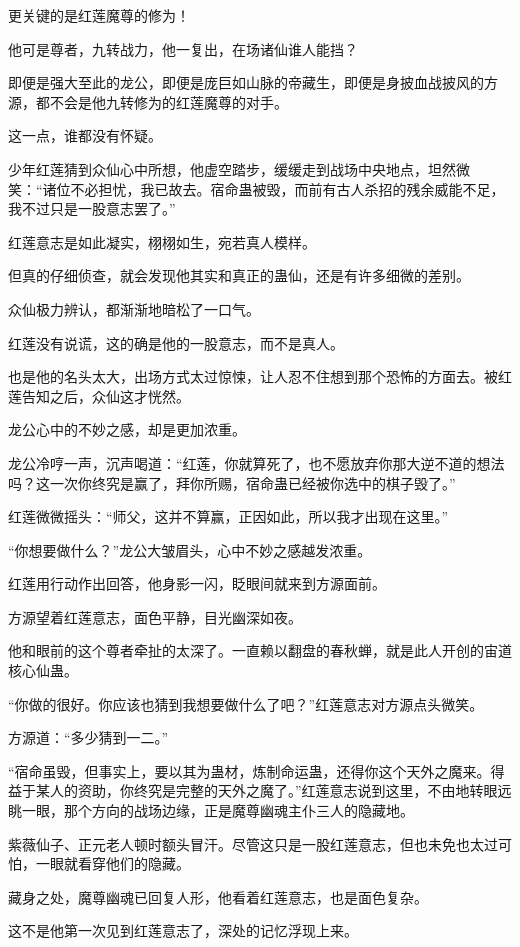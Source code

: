\begin{this_body}
更关键的是红莲魔尊的修为！

他可是尊者，九转战力，他一复出，在场诸仙谁人能挡？

即便是强大至此的龙公，即便是庞巨如山脉的帝藏生，即便是身披血战披风的方源，都不会是他九转修为的红莲魔尊的对手。

这一点，谁都没有怀疑。

少年红莲猜到众仙心中所想，他虚空踏步，缓缓走到战场中央地点，坦然微笑：“诸位不必担忧，我已故去。宿命蛊被毁，而前有古人杀招的残余威能不足，我不过只是一股意志罢了。”

红莲意志是如此凝实，栩栩如生，宛若真人模样。

但真的仔细侦查，就会发现他其实和真正的蛊仙，还是有许多细微的差别。

众仙极力辨认，都渐渐地暗松了一口气。

红莲没有说谎，这的确是他的一股意志，而不是真人。

也是他的名头太大，出场方式太过惊悚，让人忍不住想到那个恐怖的方面去。被红莲告知之后，众仙这才恍然。

龙公心中的不妙之感，却是更加浓重。

龙公冷哼一声，沉声喝道：“红莲，你就算死了，也不愿放弃你那大逆不道的想法吗？这一次你终究是赢了，拜你所赐，宿命蛊已经被你选中的棋子毁了。”

红莲微微摇头：“师父，这并不算赢，正因如此，所以我才出现在这里。”

“你想要做什么？”龙公大皱眉头，心中不妙之感越发浓重。

红莲用行动作出回答，他身影一闪，眨眼间就来到方源面前。

方源望着红莲意志，面色平静，目光幽深如夜。

他和眼前的这个尊者牵扯的太深了。一直赖以翻盘的春秋蝉，就是此人开创的宙道核心仙蛊。

“你做的很好。你应该也猜到我想要做什么了吧？”红莲意志对方源点头微笑。

方源道：“多少猜到一二。”

“宿命虽毁，但事实上，要以其为蛊材，炼制命运蛊，还得你这个天外之魔来。得益于某人的资助，你终究是完整的天外之魔了。”红莲意志说到这里，不由地转眼远眺一眼，那个方向的战场边缘，正是魔尊幽魂主仆三人的隐藏地。

紫薇仙子、正元老人顿时额头冒汗。尽管这只是一股红莲意志，但也未免也太过可怕，一眼就看穿他们的隐藏。

藏身之处，魔尊幽魂已回复人形，他看着红莲意志，也是面色复杂。

这不是他第一次见到红莲意志了，深处的记忆浮现上来。


\end{this_body}
